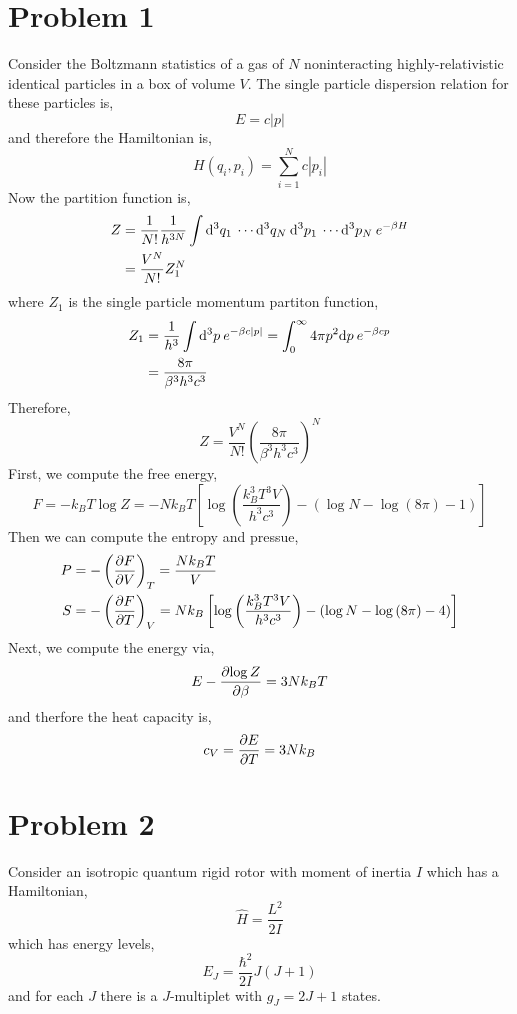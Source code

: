 \documentclass[12pt]{extarticle}
\begin{document}
 
\section{Problem 1}

Consider the Boltzmann statistics of a gas of $N$ noninteracting highly-relativistic identical particles in a box of volume $V$. The single particle dispersion relation for these particles is,
\[ E = c |p| \]
and therefore the Hamiltonian is,
\[ H(q_i, p_i) = \sum_{i = 1}^N c |p_i| \]
Now the partition function is,
\begin{align*}
Z & = \frac{1}{N!} \frac{1}{h^{3 N}} \int \mathrm{d}^{3} q_1 \: \cdots \mathrm{d}^{3} q_N \: \mathrm{d}^{3} p_1 \: \cdots \mathrm{d}^{3} p_N \: e^{- \beta H}
\\
& = \frac{V^N}{N!} Z_1^N
\end{align*}
where $Z_1$ is the single particle momentum partiton function,
\begin{align*}
Z_1 & = \frac{1}{h^3} \int \mathrm{d}^{3} p \: e^{-\beta c |p|} = \int_{0}^{\infty} 4 \pi p^2 \mathrm{d}p \: e^{-\beta c p} 
\\
& = \frac{8 \pi}{\beta^3 h^3 c^3} 
\end{align*}
Therefore,
\[ Z = \frac{V^N}{N!} \left( \frac{8 \pi}{\beta^3 h^3 c^3} \right)^N \]
First, we compute the free energy,
\[ F = - k_B T \log{Z} = - N k_B T \left[ \log{\left( \frac{k_B^3 T^3 V}{h^3 c^3} \right)} - (\log{N} - \log{(8 \pi)} - 1)  \right] \]
Then we can compute the entropy and pressue,
\begin{align*}
P & = - \left( \frac{\partial{F}}{\partial{V}} \right)_{T} = \frac{N k_B T}{V} 
\\
S & = - \left( \frac{\partial{F}}{\partial{T}} \right)_{V} = N k_B \left[ \log{\left( \frac{k_B^3 T^3 V}{h^3 c^3} \right)} - (\log{N} - \log{(8 \pi)} - 4)  \right]
\end{align*}
Next, we compute the energy via,
\begin{align*}
E - \frac{\partial{\log{Z}}}{\partial{\beta}} = 3 N k_B T 
\end{align*}
and therfore the heat capacity is,
\[ c_V = \frac{\partial{E}}{\partial{T}} = 3 N k_B \]

\section{Problem 2}

Consider an isotropic quantum rigid rotor with moment of inertia $I$ which has a Hamiltonian,
\[ \hat{H} = \frac{L^2}{2 I} \]
which has energy levels,
\[ E_J = \frac{\hbar^2}{2 I} J(J + 1) \]
and for each $J$ there is a $J$-multiplet with $g_J = 2 J + 1$ states. 
\end{document}
